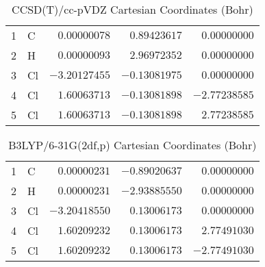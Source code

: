 \documentclass[10pt,oneside]{article}
\begin{document}
\begin{table}[h!]
\centering
\caption{CCSD(T)/cc-pVDZ Cartesian Coordinates (Bohr)}
\begin{tabular}{llrrr}
1  & C  & $ 0.00000078$ & $ 0.89423617$ & $ 0.00000000$ \\
2  & H  & $ 0.00000093$ & $ 2.96972352$ & $ 0.00000000$ \\
3  & Cl & $-3.20127455$ & $-0.13081975$ & $ 0.00000000$ \\
4  & Cl & $ 1.60063713$ & $-0.13081898$ & $-2.77238585$ \\
5  & Cl & $ 1.60063713$ & $-0.13081898$ & $ 2.77238585$ \\
\end{tabular}
\end{table}

\begin{table}[h!]
\centering
\caption{B3LYP/6-31G(2df,p) Cartesian Coordinates (Bohr)}
\begin{tabular}{llrrr}
1  & C  & $ 0.00000231$ & $-0.89020637$ & $ 0.00000000$ \\
2  & H  & $ 0.00000231$ & $-2.93885550$ & $ 0.00000000$ \\
3  & Cl & $-3.20418550$ & $ 0.13006173$ & $ 0.00000000$ \\
4  & Cl & $ 1.60209232$ & $ 0.13006173$ & $ 2.77491030$ \\
5  & Cl & $ 1.60209232$ & $ 0.13006173$ & $-2.77491030$ \\
\end{tabular}
\end{table}

\clearpage
\end{document}
